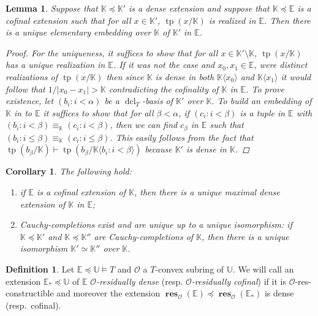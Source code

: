 \documentclass{amsart}
\newtheorem{lemma}[theorem]{Lemma}
\newtheorem{corollary}[theorem]{Corollary}
\theoremstyle{remark}
\theoremstyle{definition}
\newtheorem{definition}[theorem]{Definition}
\theoremstyle{plain}
\newcommand{\bE}{\mathbb E}
\newcommand{\bK}{\mathbb K}
\newcommand{\bU}{\mathbb U}
\newcommand{\cO}{\mathcal O}
\DeclareMathOperator{\res}{\mathbf{res}}
\DeclareMathOperator{\tp}{\mathrm{tp}}
\DeclareMathOperator{\dcl}{\mathrm{dcl}}
\theoremstyle{plain}
\begin{document}
\begin{lemma}\label{lem:dense_in_cofinal}
    Suppose that $\bK \preceq \bK'$ is a dense extension and suppose that $\bK \preceq \bE$ is a cofinal extension such that for all $x \in \bK'$, $\tp(x/\bK)$ is realized in $\bE$. Then there is a unique elementary embedding over $\bK$ of $\bK'$ in $\bE$.
    \begin{proof}
        For the uniqueness, it suffices to show that for all $x \in \bK'\setminus \bK$, $\tp(x/\bK)$ has a unique realization in $\bE$. If it was not the case and $x_0, x_1 \in \bE$, were distinct realizations of $\tp(x/\bK)$ then since $\bK$ is dense in both $\bK\langle x_0\rangle$ and $\bK\langle x_1\rangle$ it would follow that $1/|x_0-x_1|>\bK$ contradicting the cofinality of $\bK$ in $\bE$.
        To prove existence, let $(b_i: i< \alpha)$ be a $\dcl_T$-basis of $\bK'$ over $\bK$. To build an embedding of $\bK$ in to $\bE$ it suffices to show that for all $\beta<\alpha$, if $(c_i: i< \beta)$ is a tuple in $\bE$ with $(b_i:i<\beta)\equiv_\bK (c_i: i< \beta)$, then we can find $c_\beta$ in $\bE$ such that $(b_i:i\le\beta)\equiv_\bK (c_i: i\le \beta)$. This easily follows from the fact that $\tp(b_\beta/\bK)\vdash \tp(b_\beta/\bK \langle b_i: i< \beta\rangle)$ because $\bK'$ is dense in $\bK$.
    \end{proof}
\end{lemma}

\begin{corollary}\label{cor:Cauchy-completion_unique}
    The following hold:
    \begin{enumerate}
        \item if $\bE$ is a cofinal extension of $\bK$, then there is a unique maximal dense extension of $\bK$ in $\bE$;
        \item Cauchy-completions exist and are unique up to a unique isomorphism: if $\bK \preceq \bK'$ and $\bK \preceq \bK''$ are Cauchy-completions of $\bK$, then there is a unique isomorphism $\bK'\simeq \bK''$ over $\bK$.
    \end{enumerate}
\end{corollary}

\begin{definition}\label{def:res-c-dc}
    Let $\bE \preceq \bU \models T$ and $\cO$ a $T$-convex subring of $\bU$. We will call an extension $\bE_*\preceq \bU$ of $\bE$ \emph {$\cO$-residually dense} (resp. \emph{$\cO$-residually cofinal}) if it is $\cO$-res-constructible and moreover the extension $\res_{\cO}(\bE) \preceq \res_{\cO}(\bE_*)$ is dense (resp.\ cofinal).
\end{definition}
\end{document}
